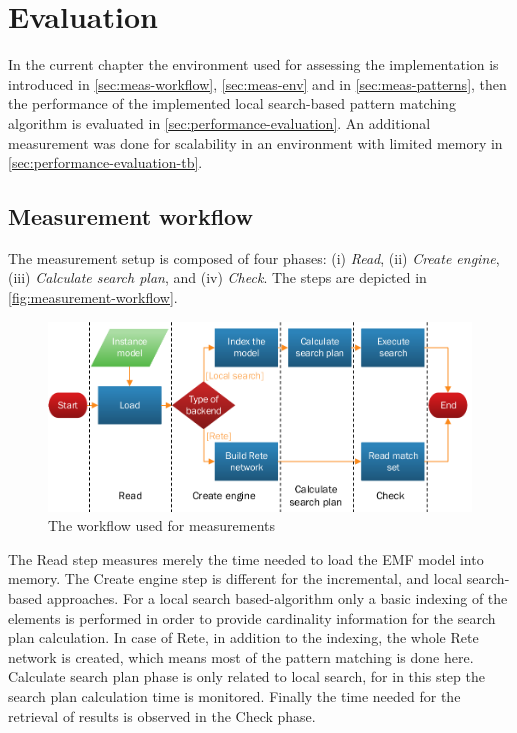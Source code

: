 \chapter{Evaluation}
\label{chap:evaluation}

In the current chapter the environment used for assessing the implementation is introduced in \autoref{sec:meas-workflow}, \autoref{sec:meas-env} and in \autoref{sec:meas-patterns}, then the performance of the implemented local search-based pattern matching algorithm is evaluated in \autoref{sec:performance-evaluation}. An additional measurement was done for scalability in an environment with limited memory in \autoref{sec:performance-evaluation-tb}.

\section{Measurement workflow}
\label{sec:meas-workflow}

The measurement setup is composed of four phases: (i) \emph{Read}, (ii) \emph{Create engine}, (iii) \emph{Calculate search plan}, and (iv) \emph{Check}. The steps are depicted in \autoref{fig:measurement-workflow}. 

\begin{figure}[!htp]
	\centering
	\includegraphics[width=\textwidth]{figures/pdfs/measurement_workflow.pdf}
	\caption{The workflow used for measurements}
	\label{fig:measurement-workflow}
\end{figure}

The Read step measures merely the time needed to load the EMF model into memory. The Create engine step is different for the incremental, and local search-based approaches. For a local search based-algorithm only a basic indexing of the elements is performed in order to provide cardinality information for the search plan calculation. In case of Rete, in addition to the indexing, the whole Rete network is created, which means most of the pattern matching is done here. Calculate search plan phase is only related to local search, for in this step the search plan calculation time is monitored. Finally the time needed for the retrieval of results is observed in the Check phase.



